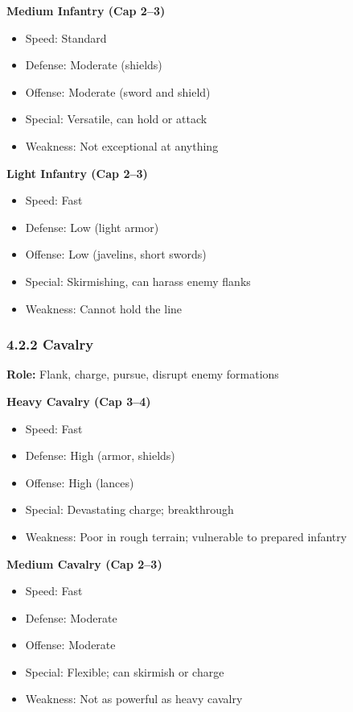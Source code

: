 \documentclass[11pt]{article}
\begin{document}
\textbf{Medium Infantry (Cap 2–3)}\\
\begin{itemize}
  \item Speed: Standard
  \item Defense: Moderate (shields)
  \item Offense: Moderate (sword and shield)
  \item Special: Versatile, can hold or attack
  \item Weakness: Not exceptional at anything
\end{itemize}

\textbf{Light Infantry (Cap 2–3)}\\
\begin{itemize}
  \item Speed: Fast
  \item Defense: Low (light armor)
  \item Offense: Low (javelins, short swords)
  \item Special: Skirmishing, can harass enemy flanks
  \item Weakness: Cannot hold the line
\end{itemize}

\subsubsection{4.2.2 Cavalry}

\textbf{Role:} Flank, charge, pursue, disrupt enemy formations

\textbf{Heavy Cavalry (Cap 3–4)}\\
\begin{itemize}
  \item Speed: Fast
  \item Defense: High (armor, shields)
  \item Offense: High (lances)
  \item Special: Devastating charge; breakthrough
  \item Weakness: Poor in rough terrain; vulnerable to prepared infantry
\end{itemize}

\textbf{Medium Cavalry (Cap 2–3)}\\
\begin{itemize}
  \item Speed: Fast
  \item Defense: Moderate
  \item Offense: Moderate
  \item Special: Flexible; can skirmish or charge
  \item Weakness: Not as powerful as heavy cavalry
\end{itemize}
\end{document}
